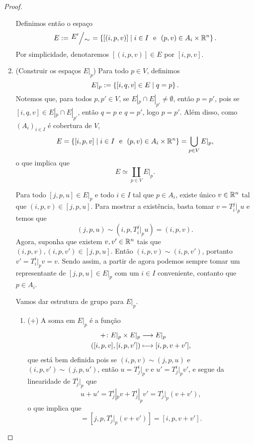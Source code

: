 \begin{proof}
\begin{enumerate}
Definimos então o espaço
	\begin{equation*}
	E:= \quo{E'}{\sim} = \set{[(i,p,v)]}{i \in I \text{\ \ e\ \ } (p,v) \in A_i \times \R^n}.
	\end{equation*}
Por simplicidade, denotaremos $[(i,p,v)] \in E$ por $[i,p,v]$.

\item (Construir os espaços $E|_p$) Para todo $p \in V$, definimos
	\begin{equation*}
	E|_p := \left\{{[i,q,v] \in E}\;\middle\vert\;{q=p}\right\}.
	\end{equation*}
Notemos que, para todos $p,p' \in V$, se $E|_p \cap E|_{p'} \neq \emptyset$, então $p=p'$, pois se $[i,q,v] \in E|_p \cap E|_{p'}$, então $q=p$ e $q=p'$, logo $p=p'$. Além disso, como $(A_i)_{i \in I}$ é cobertura de $V$,
	\begin{equation*}
	E = \left\{{[i,p,v]}\;\middle\vert\;{i \in I \text{\ \ e\ \ } (p,v) \in A_i \times \mathbb{R}^n}\right\} = \bigcup_{p \in V} E|_p,
	\end{equation*}
o que implica que
	\begin{equation*}
	E \simeq \coprod_{p \in V} E|_p.
	\end{equation*}

Para todo $[j,p,u] \in E|_p$ e todo $i \in I$ tal que $p \in A_i$, existe único $v \in \mathbb{R}^n$ tal que $(i,p,v) \in [j,p,u]$. Para mostrar a existência, basta tomar $v = T^j_i|_p u$ e temos que
	\begin{equation*}
	(j,p,u) \sim (i,p,T^j_i|_p u) = (i,p,v).
	\end{equation*}
Agora, suponha que existem $v,v' \in \mathbb{R}^n$ tais que $(i,p,v), (i,p,v') \in [j,p,u]$. Então $(i,p,v) \sim (i,p,v')$, portanto $v' = T^i_i|_p v = v$.
Sendo assim, a partir de agora podemos sempre tomar um representante de $[j,p,u] \in E|_p$ com um $i \in I$ conveniente, contanto que $p \in A_i$.

Vamos dar estrutura de grupo para $E|_p$.
	\begin{enumerate}
	\item ($+$) A soma em $E|_p$ é a função
	\begin{align*}
	{+}\colon {E|_p \times E|_p} &\longrightarrow {E|_p} \\{([i,p,v] , [i,p,v'])} &\longmapsto [i,p,v + v'],
	\end{align*}
que está bem definida pois se $(i,p,v) \sim (j,p,u)$ e $(i,p,v') \sim (j,p,u')$, então $u = T^i_j|_p v$ e $u' = T^i_j|_p v'$, e segue da linearidade de $T^i_j|_p$ que
	\begin{equation*}
	u + u' = T^i_j|_p v + T^i_j|_p v' = T^i_j|_p (v + v'),
	\end{equation*}
o que implica que
	\begin{equation*}
	[j,p,u + u'] = [j,p,T^i_j|_p (v + v')] = [i,p,v + v'].
	\end{equation*}


\end{enumerate}
\end{enumerate}
\end{proof}

